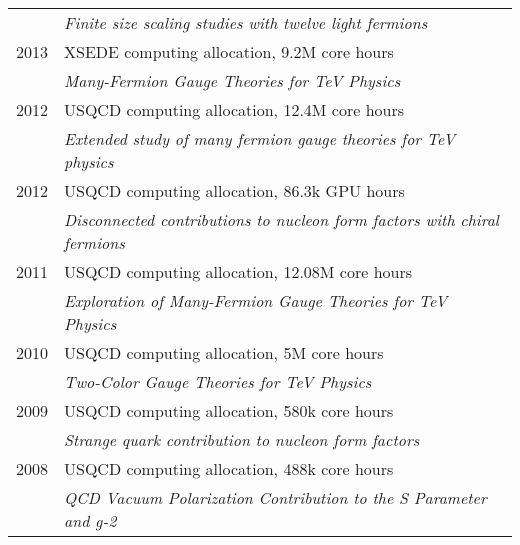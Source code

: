 \begin{spacelistout}
\begin{tabular}[t]{cl}
           & \textit{Finite size scaling studies with twelve light fermions}                                                                                   \\[6 pt]
      2013 & XSEDE computing allocation, 9.2M core hours                                                                                                       \\ %
           & \textit{Many-Fermion Gauge Theories for TeV Physics}                                                                                              \\[6 pt]
      2012 & USQCD computing allocation, 12.4M core hours                                                                                                      \\ %
           & \textit{Extended study of many fermion gauge theories for TeV physics}                                                                            \\[6 pt]
      2012 & USQCD computing allocation, 86.3k GPU hours                                                                                                       \\ %
           & \textit{Disconnected contributions to nucleon form factors with chiral fermions}                                                                  \\[6 pt]
      2011 & USQCD computing allocation, 12.08M core hours                                                                                                     \\ %
           & \textit{Exploration of Many-Fermion Gauge Theories for TeV Physics}                                                                               \\[6 pt]
      2010 & USQCD computing allocation, 5M core hours                                                                                                         \\ %
           & \textit{Two-Color Gauge Theories for TeV Physics}                                                                                                 \\[6 pt]
      2009 & USQCD computing allocation, 580k core hours                                                                                                       \\ %
           & \textit{Strange quark contribution to nucleon form factors}                                                                                       \\[6 pt]
      2008 & USQCD computing allocation, 488k core hours                                                                                                       \\ %
           & \textit{QCD Vacuum Polarization Contribution to the S Parameter and g-2}                                                                          \\[6 pt]
    \end{tabular}
\end{spacelistout}

